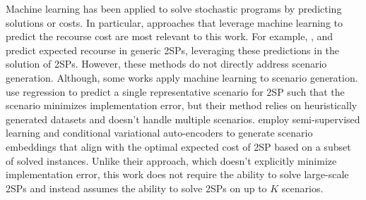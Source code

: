 Machine learning has been applied to solve stochastic programs by predicting solutions or costs. In particular, approaches that leverage machine learning to predict the recourse cost are most relevant to this work. For example, \citet{patel2022neur2sp}, \citet{lee2023value} and \citet{bae2023deep} predict expected recourse in generic 2SPs, leveraging these predictions in the solution of 2SPs. However, these methods do not directly address scenario generation. Although, some works apply machine learning to scenario generation. \citet{bengio2020learning} use regression to predict a single representative scenario for 2SP such that the scenario minimizes implementation error, but their method relies on heuristically generated datasets and doesn't handle multiple scenarios. \citet{wu2022learning} employ semi-supervised learning and conditional variational auto-encoders to generate scenario embeddings that align with the optimal expected cost of 2SP based on a subset of solved instances. Unlike their approach, which doesn't explicitly minimize implementation error, this work does not require the ability to solve large-scale 2SPs and instead assumes the ability to solve 2SPs on up to $K$ scenarios.






